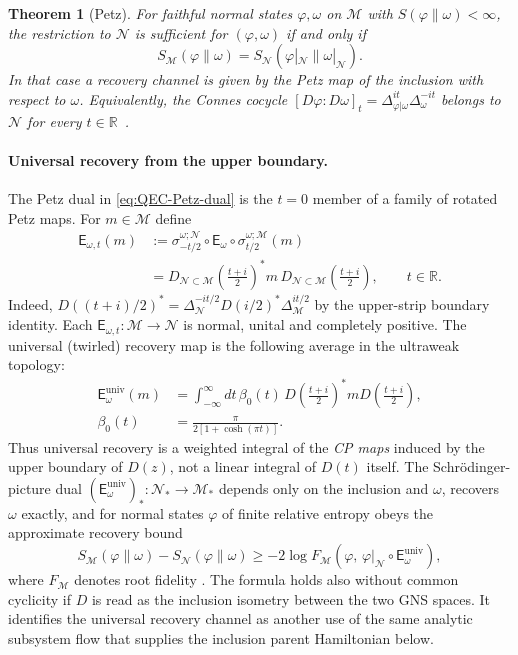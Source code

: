 \documentclass[a4paper,11pt]{article}
\newtheorem{theorem}{Theorem}
\theoremstyle{definition}
\newcommand{\nn}{\nonumber}
\newcommand{\mN}{\mathcal{N}}
\newcommand{\mM}{\mathcal{M}}
\begin{document}
\begin{theorem}[Petz]\label{thm:Petz}
For faithful normal states $\varphi,\omega$ on $\mM$ with $S(\varphi\|\omega)<\infty$, the restriction to $\mN$ is sufficient for $(\varphi,\omega)$ if and only if
\[
 S_{\mM}(\varphi\|\omega)=S_{\mN}(\varphi|_{\mN}\|\omega|_{\mN}) .
\]
In that case a recovery channel is given by the Petz map of the inclusion with respect to $\omega$. Equivalently, the Connes cocycle $[D\varphi:D\omega]_t=\Delta_{\varphi|\omega}^{it}\Delta_{\omega}^{-it}$ belongs to $\mN$ for every $t\in\mathbb R$~\cite{Petz1988,JencovaPetz2006}.
\end{theorem}

\paragraph{Universal recovery from the upper boundary.}
The Petz dual in \eqref{eq:QEC-Petz-dual} is the $t=0$ member of a family
of rotated Petz maps. For $m\in\mM$ define
\begin{align}
 \mathsf E_{\omega,t}(m)
 &:=\sigma_{-t/2}^{\omega;\mN}
 \!\circ\mathsf E_\omega\circ
 \sigma_{t/2}^{\omega;\mM}(m)\nn\\
 &=D_{\mN\subset\mM}\!\left(\frac{t+i}{2}\right)^*
 m\,D_{\mN\subset\mM}\!\left(\frac{t+i}{2}\right),
 \qquad t\in\mathbb R.
 \label{eq:rotated-Petz-D}
\end{align}
Indeed, $D((t+i)/2)^*=\Delta_{\mN}^{-it/2}
D(i/2)^*\Delta_{\mM}^{it/2}$ by the upper-strip boundary
identity. Each $\mathsf E_{\omega,t}:\mM\to\mN$ is normal, unital
and completely positive. The universal (twirled) recovery map is the
following average in the ultraweak topology:
\begin{align}
 \mathsf E_\omega^{\mathrm{univ}}(m)
 &=\int_{-\infty}^{\infty}\!dt\,\beta_0(t)\,
 D\!\left(\frac{t+i}{2}\right)^*m
 D\!\left(\frac{t+i}{2}\right),\nn\\
 \beta_0(t)&=\frac{\pi}{2[1+\cosh(\pi t)]}.
 \label{eq:universal-recovery-D}
\end{align}
Thus universal recovery is a weighted integral of the \emph{CP maps}
induced by the upper boundary of $D(z)$, not a linear integral of
$D(t)$ itself. The Schr\"odinger-picture dual
$(\mathsf E_\omega^{\mathrm{univ}})_*:\mN_*\to\mM_*$ depends only
on the inclusion and $\omega$, recovers $\omega$ exactly, and for
normal states $\varphi$ of finite relative entropy obeys the
approximate recovery bound
\begin{equation}
 S_{\mM}(\varphi\|\omega)-S_{\mN}(\varphi\|\omega)
 \geq -2\log F_{\mM}\!\left(
 \varphi,\,\varphi|_{\mN}\circ
 \mathsf E_\omega^{\mathrm{univ}}\right),
 \label{eq:universal-recovery-bound}
\end{equation}
where $F_{\mM}$ denotes root fidelity
\cite{JungeRennerSutterWildeWinter2018,FaulknerHollandsSwingleWang2022}.
The formula holds also without common cyclicity if $D$ is read as the
inclusion isometry between the two GNS spaces. It identifies the
universal recovery channel as another use of the same analytic
subsystem flow that supplies the inclusion parent Hamiltonian below.
\end{document}
